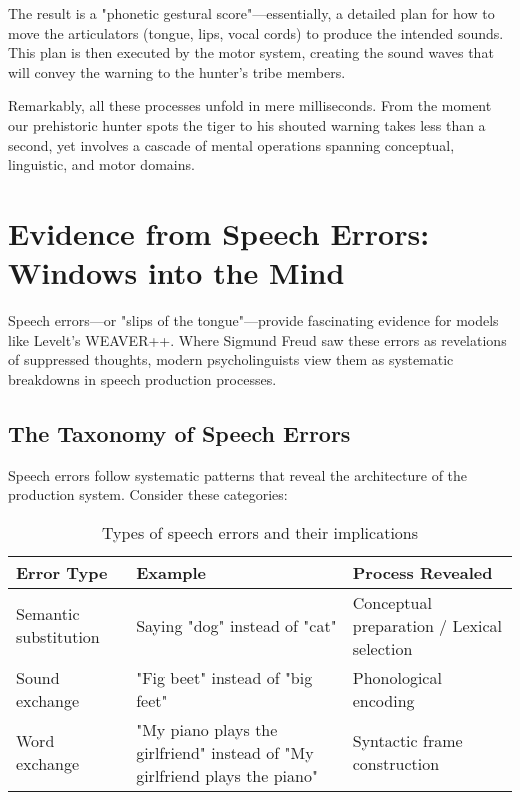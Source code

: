 \documentclass[12pt,a4paper]{article}
\begin{document}
The result is a "phonetic gestural score"—essentially, a detailed plan for how to move the articulators (tongue, lips, vocal cords) to produce the intended sounds. This plan is then executed by the motor system, creating the sound waves that will convey the warning to the hunter's tribe members.

\begin{tcolorbox}[enhanced, frame style={red!75!black}, interior style={red!10}]
Remarkably, all these processes unfold in mere milliseconds. From the moment our prehistoric hunter spots the tiger to his shouted warning takes less than a second, yet involves a cascade of mental operations spanning conceptual, linguistic, and motor domains.
\end{tcolorbox}

\section{Evidence from Speech Errors: Windows into the Mind}

Speech errors—or "slips of the tongue"—provide fascinating evidence for models like Levelt's WEAVER++. Where Sigmund Freud saw these errors as revelations of suppressed thoughts, modern psycholinguists view them as systematic breakdowns in speech production processes.

\subsection{The Taxonomy of Speech Errors}

Speech errors follow systematic patterns that reveal the architecture of the production system. Consider these categories:

\begin{table}[h]
\centering
\begin{tabular}{|p{3cm}|p{5cm}|p{5cm}|}
\hline
\textbf{Error Type} & \textbf{Example} & \textbf{Process Revealed} \\
\hline
Semantic substitution & Saying "dog" instead of "cat" & Conceptual preparation / Lexical selection \\
\hline
Sound exchange & "Fig beet" instead of "big feet" & Phonological encoding \\
\hline
Word exchange & "My piano plays the girlfriend" instead of "My girlfriend plays the piano" & Syntactic frame construction \\
\hline
\end{tabular}
\caption{Types of speech errors and their implications}
\label{tbl:error_types}
\end{table}
\end{document}
